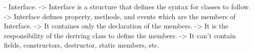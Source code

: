 - Interface.
-> Interface is a structure that defines the syntax for classes to follow.
-> Interface defines property, methods, and events which are the members of Interface.
-> It containes only the declaration of the members.
-> It is the responsibility of the deriving class to define the members.
-> It can't contain fields, constructors, destructor, static members, etc.  